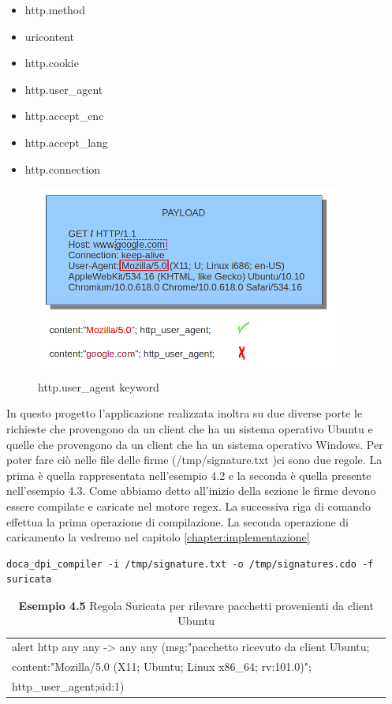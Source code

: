 \documentclass[binding=0.6cm]{sapthesis}
\theoremstyle{definition}
\begin{document}
\begin{itemize}[topsep=10pt, noitemsep]
    \item http.method
    \item uricontent
    \item http.cookie
    \item http.user\_agent
    \item http.accept\_enc
    \item http.accept\_lang
    \item http.connection


\end{itemize}
\begin{figure}[ht]
    \centering
    \includegraphics[scale=0.8]{user_agent_match.png}
    \caption{http.user\_agent keyword}
    \label{fig:user-agent}
\end{figure}


In questo progetto l'applicazione realizzata  inoltra su due diverse porte le richieste che 
provengono da un client che ha un sistema operativo Ubuntu e quelle che provengono da un 
client che ha un sistema operativo Windows. Per poter fare ciò nelle file delle firme 
(/tmp/signature.txt )ci sono due regole. La prima è quella rappresentata nell'esempio 4.2
e la seconda è quella presente nell'esempio 4.3.
Come abbiamo detto all'inizio della sezione le firme devono essere compilate e caricate nel 
motore regex. La successiva riga di comando effettua la prima operazione di compilazione.
La seconda operazione di caricamento la vedremo nel capitolo \ref{chapter:implementazione}

\begin{verbatim}
doca_dpi_compiler -i /tmp/signature.txt -o /tmp/signatures.cdo -f suricata
\end{verbatim}

\begin{table}[ht]
    \centering
    \caption*{\textbf{Esempio 4.5 } Regola Suricata per rilevare pacchetti provenienti da client Ubuntu}
    \begin{tabular}{ |l|c|}
        \hline
        alert http any any -> any any (msg:"pacchetto ricevuto da client Ubuntu;\\
        content:"Mozilla/5.0 (X11; Ubuntu; Linux x86\_64; rv:101.0)"; \\
        http\_user\_agent;sid:1)\\

        \hline
    \end{tabular}
\end{table}
\end{document}

